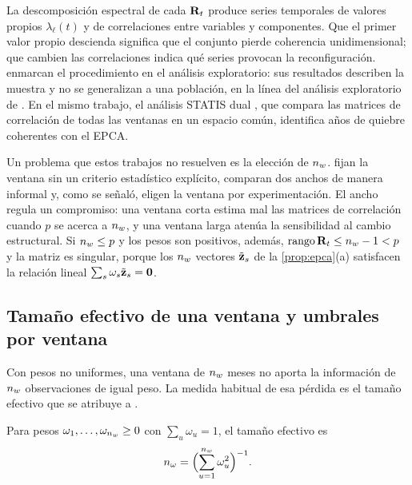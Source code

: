 La descomposición espectral de cada $\mathbf{R}_t$ produce series temporales de valores propios
$\lambda_\ell(t)$ y de correlaciones entre variables y componentes. Que el primer valor propio
descienda significa que el conjunto pierde coherencia unidimensional; que cambien las
correlaciones indica qué series provocan la reconfiguración.
\textcite{camiz_maulucci_roig_2010} enmarcan el procedimiento en el análisis exploratorio: sus
resultados describen la muestra y no se generalizan a una población, en la línea del análisis
exploratorio de \textcite{tukey_1977}. En el mismo trabajo, el análisis STATIS dual \parencite{lavit_et_al_1994}, que compara las matrices de correlación de
todas las ventanas en un espacio común, identifica años de quiebre coherentes con el EPCA.

Un problema que estos trabajos no resuelven es la elección de $n_{w}$.
\textcite{camiz_maulucci_roig_2010} fijan la ventana sin un criterio estadístico explícito,
\textcite{camiz_roig_2011} comparan dos anchos de manera informal y, como se señaló,
\textcite{camiz_cerda_atoche_2026} eligen la ventana por experimentación. El ancho regula un
compromiso: una ventana corta estima mal las matrices de correlación cuando $p$ se acerca a $n_{w}$,
y una ventana larga atenúa la sensibilidad al cambio estructural. Si $n_{w}\le p$ y los pesos son positivos, además,
$\operatorname{rango}\mathbf{R}_t\le n_{w}-1<p$ y la matriz es singular, porque los $n_{w}$ vectores
$\tilde{\mathbf{z}}_s$ de la \cref{prop:epca}(a) satisfacen la relación lineal
$\sum_s\omega_s\tilde{\mathbf{z}}_s=\mathbf{0}$.

\subsection{Tamaño efectivo de una ventana y umbrales por ventana}
\label{sec:kish}

Con pesos no uniformes, una ventana de $n_{w}$ meses no aporta la información de $n_{w}$
observaciones de igual peso. La medida habitual de esa pérdida es el tamaño efectivo que se
atribuye a \textcite{kish_1965}.

\begin{definicion}\label{def:kish}
Para pesos $\omega_1,\dots,\omega_{n_{w}}\ge0$ con $\sum_u\omega_u=1$, el tamaño efectivo es
\begin{equation}\label{eq:kish}
  n_{\omega}=\Bigl(\sum_{u=1}^{n_{w}}\omega_u^2\Bigr)^{-1}.
\end{equation}
\end{definicion}

